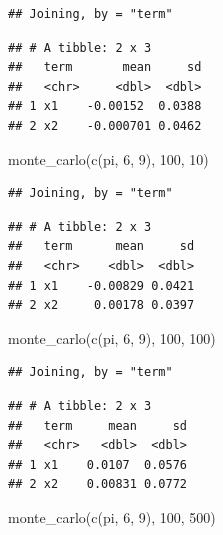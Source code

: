 \documentclass[
]{article}
\newenvironment{Shaded}{\begin{snugshade}}{\end{snugshade}}
\newcommand{\DecValTok}[1]{\textcolor[rgb]{0.00,0.00,0.81}{#1}}
\newcommand{\FunctionTok}[1]{\textcolor[rgb]{0.00,0.00,0.00}{#1}}
\newcommand{\NormalTok}[1]{#1}
\begin{document}
\begin{verbatim}
## Joining, by = "term"
\end{verbatim}

\begin{verbatim}
## # A tibble: 2 x 3
##   term       mean     sd
##   <chr>     <dbl>  <dbl>
## 1 x1    -0.00152  0.0388
## 2 x2    -0.000701 0.0462
\end{verbatim}

\begin{Shaded}
\begin{Highlighting}[]
\FunctionTok{monte\_carlo}\NormalTok{(}\FunctionTok{c}\NormalTok{(pi, }\DecValTok{6}\NormalTok{, }\DecValTok{9}\NormalTok{), }\DecValTok{100}\NormalTok{, }\DecValTok{10}\NormalTok{)}
\end{Highlighting}
\end{Shaded}

\begin{verbatim}
## Joining, by = "term"
\end{verbatim}

\begin{verbatim}
## # A tibble: 2 x 3
##   term      mean     sd
##   <chr>    <dbl>  <dbl>
## 1 x1    -0.00829 0.0421
## 2 x2     0.00178 0.0397
\end{verbatim}

\begin{Shaded}
\begin{Highlighting}[]
\FunctionTok{monte\_carlo}\NormalTok{(}\FunctionTok{c}\NormalTok{(pi, }\DecValTok{6}\NormalTok{, }\DecValTok{9}\NormalTok{), }\DecValTok{100}\NormalTok{, }\DecValTok{100}\NormalTok{)}
\end{Highlighting}
\end{Shaded}

\begin{verbatim}
## Joining, by = "term"
\end{verbatim}

\begin{verbatim}
## # A tibble: 2 x 3
##   term     mean     sd
##   <chr>   <dbl>  <dbl>
## 1 x1    0.0107  0.0576
## 2 x2    0.00831 0.0772
\end{verbatim}

\begin{Shaded}
\begin{Highlighting}[]
\FunctionTok{monte\_carlo}\NormalTok{(}\FunctionTok{c}\NormalTok{(pi, }\DecValTok{6}\NormalTok{, }\DecValTok{9}\NormalTok{), }\DecValTok{100}\NormalTok{, }\DecValTok{500}\NormalTok{)}
\end{Highlighting}
\end{Shaded}
\end{document}
